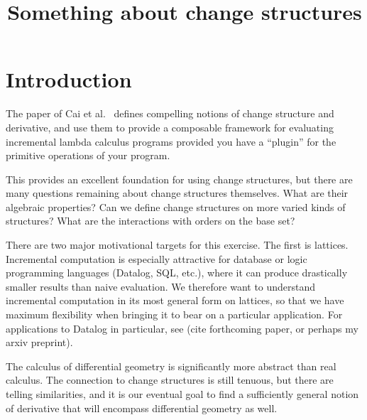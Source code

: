 

%

\usepackage{amsmath}
\usepackage{amsthm}
\usepackage{amssymb}
\usepackage{mathtools}
\usepackage{stmaryrd}






%

\title{Something about change structures}

\maketitle

\section{Introduction}

The paper of Cai et al.~\cite{cai2014changes} defines compelling notions
of change structure and derivative, and use them to provide a composable framework for
evaluating incremental lambda calculus programs provided you have a ``plugin'' for the
primitive operations of your program.

This provides an excellent foundation for using change structures, but there are
many questions remaining about change structures themselves. What are their
algebraic properties? Can we define change structures on more varied kinds of
structures? What are the interactions with orders on the base set?

There are two major motivational targets for this exercise. The first is
lattices. Incremental computation is especially attractive for database or logic
programming languages (Datalog, SQL, etc.), where it can produce drastically
smaller results than naive evaluation. We therefore want to understand
incremental computation in its most general form on lattices, so that we have
maximum flexibility when bringing it to bear on a particular application. For
applications to Datalog in particular, see (cite forthcoming paper, or perhaps
my arxiv preprint).

The calculus of differential geometry is significantly more abstract than real
calculus. The connection to change structures is still tenuous, but there are
telling similarities, and it is our eventual goal to find a sufficiently general
notion of derivative that will encompass differential geometry as well.

